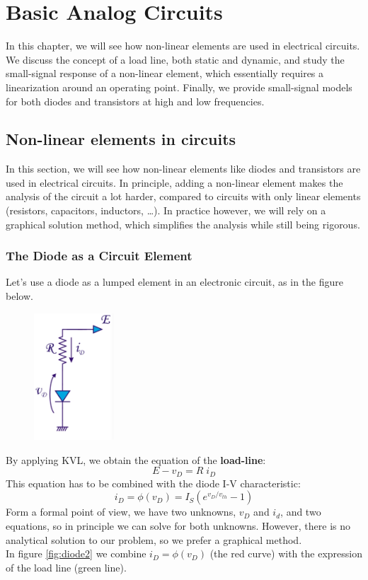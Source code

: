 \chapter{Basic Analog Circuits}
In this chapter, we will see how non-linear elements are used in electrical circuits. We discuss the concept of a load line, both static and dynamic, and study the small-signal response of a non-linear element, which essentially requires a linearization around an operating point. Finally, we provide small-signal models for both diodes and transistors at high and low frequencies.

\section{Non-linear elements in circuits}
\label{sec:nonlin_circuits}
In this section, we will see how non-linear elements like diodes and transistors are used in electrical circuits. In principle, adding a non-linear element makes the analysis of the circuit a lot harder, compared to circuits with only linear elements (resistors, capacitors, inductors, \ldots). In practice however, we will rely on a graphical solution method, which simplifies the analysis while still being rigorous.
\subsection{The Diode as a Circuit Element}
Let's use a diode as a lumped element in an electronic circuit, as in the  figure below. 

\begin{figure}
	\centering
	\includegraphics[width=3cm]{figures/ch02/diode1.jpg}
	\caption{}
	\label{fig:diode1}
\end{figure}
By applying KVL, we obtain the equation of the \textbf{load-line}:
$$
E - v_D = R \; i_D
$$
This equation has to be combined with the diode I-V characteristic:
$$
i_D = \phi(v_D) = I_S (e^{v_D/v_{th}} - 1)
$$
Form a formal point of view, we have two unknowns, $v_D$ and $i_d$, and two equations, so in principle we can solve for both unknowns. However, there is no analytical solution to our problem, so we prefer a graphical method.\\
In figure \ref{fig:diode2} we combine $i_D = \phi(v_D)$ (the red curve) with the expression of the load line (green line).

